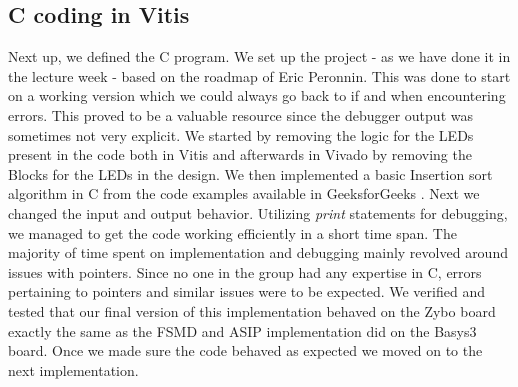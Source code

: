 \documentclass[conference]{IEEEtran}
\begin{document}
\subsection{C coding in Vitis}
Next up, we defined the C program. We set up the project - as we have done it in the lecture week - based on the roadmap of Eric Peronnin. This was done to start on a working version which we could always go back to if and when encountering errors. This proved to be a valuable resource since the debugger output was sometimes not very explicit. We started by removing the logic for the LEDs present in the code both in Vitis and afterwards in Vivado by removing the Blocks for the LEDs in the design. We then implemented a basic Insertion sort algorithm in C from the code examples available in GeeksforGeeks \cite{g4g}. Next we changed the input and output behavior. Utilizing \textit{print} statements for debugging, we managed to get the code working efficiently in a short time span. The majority of time spent on implementation and debugging mainly revolved around issues with pointers. Since no one in the group had any expertise in C, errors pertaining to pointers and similar issues were to be expected. We verified and tested that our final version of this implementation behaved on the Zybo board exactly the same as the FSMD and ASIP implementation did on the Basys3 board. Once we made sure the code behaved as expected we moved on to the next implementation.
\end{document}
